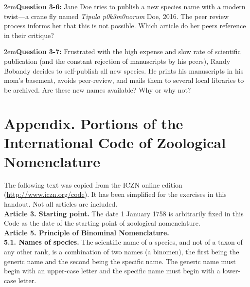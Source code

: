 \documentclass[letterpaper, 11pt]{article}
\begin{document}
\hangindent2em\textbf{Question 3-6:} Jane Doe tries to publish a new species name with a modern twist---a crane fly named \textit{Tipula p0k3m0norum} Doe, 2016. The peer review process informs her that this is not possible. Which article do her peers reference in their critique?

\hangindent2em\textbf{Question 3-7:} Frustrated with the high expense and slow rate of scientific publication (and the constant rejection of manuscripts by his peers), Randy Bobandy decides to self-publish all new species. He prints his manuscripts in his mom's basement, avoids peer-review, and mails them to several local libraries to be archived. Are these new names available? Why or why not?

\FloatBarrier


\clearpage

\section*{Appendix. Portions of the International Code of Zoological Nomenclature}
The following text was copied from the ICZN online edition (\url{http://www.iczn.org/code}). It has been simplified for the exercises in this handout. Not all articles are included.\\

\noindent{}\textbf{Article 3. Starting point.} The date 1 January 1758 is arbitrarily fixed in this Code as the date of the starting point of zoological nomenclature.\\

\noindent{}\textbf{Article 5. Principle of Binominal Nomenclature.}\\
\noindent{}\textbf{5.1. Names of species.} The scientific name of a species, and not of a taxon of any other rank, is a combination of two names (a binomen), the first being the generic name and the second being the specific name. The generic name must begin with an upper-case letter and the specific name must begin with a lower-case letter.\\
\end{document}
